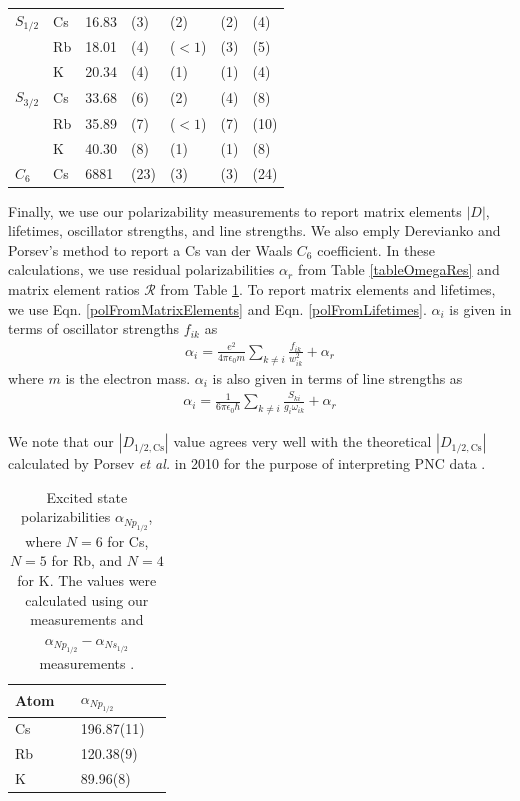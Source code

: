 \documentclass[twocolumn,prl,showpacs,superscriptaddress]{revtex4-1}   %
\newcommand{\sspace}{$\enspace$}
\newcommand{\eqnref}[1]{Eqn. \eqref{#1}}
\newcommand{\etalspace}{\textit{et al. }}
\begin{document}
\begin{table}
\begin{center}
\begin{tabular}{lllllll}
$S_{1/2}$ 			& Cs & 16.83 & (3) & (2) & (2) & (4) \\
 					& Rb & 18.01 & (4) & ($<1$) & (3) & (5) \\
 					& K  & 20.34 & (4) & (1) & (1) & (4) \\ \hline
$S_{3/2}$ 			& Cs & 33.68 & (6) & (2) & (4) & (8) \\
 					& Rb & 35.89 & (7) & ($<1$) & (7) & (10) \\
 					& K  & 40.30 & (8) & (1) & (1) & (8) \\ \hline
$C_6$ 				& Cs & 6881 & (23) & (3) & (3) & (24) \\ \hline
\hline
\end{tabular}
\end{center}
\end{table}
\endgroup

Finally, we use our polarizability measurements to report matrix elements $|D|$, lifetimes, oscillator strengths, and line strengths. We also emply Derevianko and Porsev's method to report a Cs van der Waals $C_6$ coefficient.
In these calculations, we use residual polarizabilities $\alpha_r$ from Table \ref{tableOmegaRes} and matrix element ratios $\mathcal{R}$
from Table \ref{tableR}.
To report matrix elements and lifetimes, we use \eqnref{polFromMatrixElements} and \eqnref{polFromLifetimes}. $\alpha_i$ is given in terms of oscillator strengths $f_{ik}$ as 
\begin{align}
	\alpha_i = \frac{e^2}{4 \pi \epsilon_0 m}
	\sum_{k \neq i}
	\frac{f_{ik}}{w_{ik}^2}
	+ \alpha_r
	\label{polFromOscStr}
\end{align}
where $m$ is the electron mass. 
$\alpha_i$ is also given in terms of line strengths as
\begin{align}
	\alpha_i = \frac{1}{6\pi\epsilon_0\hbar} 
	\sum_{k \neq i} 
	\frac{S_{ki}}{g_i\omega_{ik}}
	+ \alpha_r
	\label{polFromLineStr}
\end{align}

We note that our $\left|D_{1/2,\mathrm{Cs}}\right|$ value agrees very well with the theoretical $\left|D_{1/2,\mathrm{Cs}}\right|$ calculated by Porsev \etalspace in 2010 for the purpose of interpreting PNC data \cite{Porsev2010}.

\begingroup
\begin{table}
\caption{\label{tableR}Excited state polarizabilities $\alpha_{Np_{1/2}}$, where $N = 6$ for Cs, $N = 5$ for Rb, and $N = 4$ for K. The values were calculated using our measurements and $\alpha_{Np_{1/2}} - \alpha_{Ns_{1/2}}$ measurements \cite{Hunter1991,Miller1994}.}
\begin{center}
\begin{tabular}{l l l}
\hline\hline
Atom \sspace & $\alpha_{Np_{1/2}}$ \\
\hline
Cs & 196.87(11) \\
Rb & 120.38(9) \\
K  & 89.96(8) \\
\hline\hline
\end{tabular}
\end{center}
\end{table}
\endgroup
\end{document}
